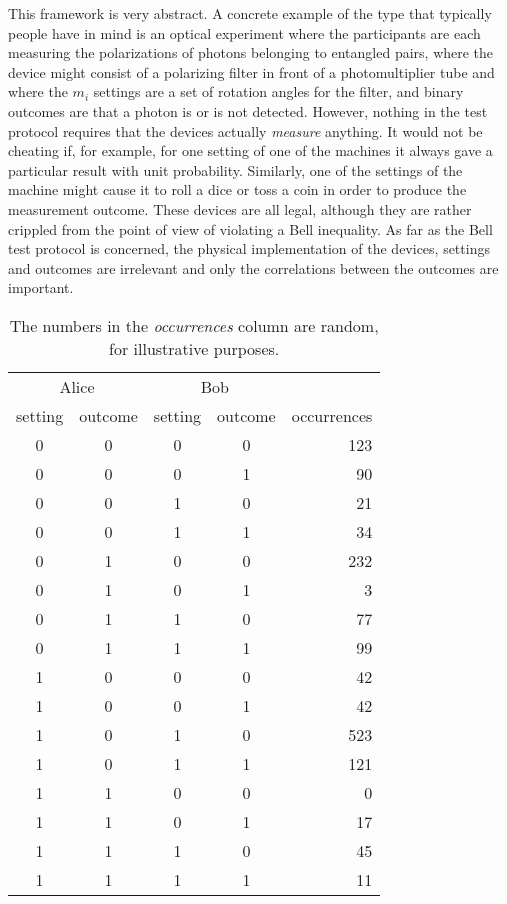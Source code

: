 This framework is very abstract. A concrete example of the type that typically people have in mind is an optical experiment where the participants are each measuring the polarizations of photons belonging to entangled pairs, where the device might consist of a polarizing filter in front of a photomultiplier tube and where the $m_i$ settings are a set of rotation angles for the filter, and binary outcomes are that a photon is or is not detected. However, nothing in the test protocol requires that the devices actually \emph{measure} anything. It would not be cheating if, for example, for one setting of one of the machines it always gave a particular result with unit probability. Similarly, one of the settings of the machine might cause it to roll a dice or toss a coin in order to produce the measurement outcome. These devices are all legal, although they are rather crippled from the point of view of violating a Bell inequality. As far as the Bell test protocol is concerned, the physical implementation of the devices, settings and outcomes are irrelevant and only the correlations between the outcomes are important.

\begin{table}
    \centering
    \footnotesize
    \begin{threeparttable}
    \caption{ The numbers in the \emph{occurrences} column are random, for illustrative purposes.\label{tab:compiled}}
    \begin{singlespace}
        \begin{tabular}{@{}ccccr@{}}
            \toprule
            \multicolumn{2}{c}{Alice} & \multicolumn{2}{c}{Bob}&\\
            \cmidrule(r){1-2}\cmidrule(lr){3-4}
            setting & outcome   & setting & outcome & occurrences\\
            \midrule
            0&0&0&0&123\\
            0&0&0&1&90\\
            0&0&1&0&21\\
            0&0&1&1&34\\
            0&1&0&0&232\\
            0&1&0&1&3\\
            0&1&1&0&77\\
            0&1&1&1&99\\
            1&0&0&0&42\\
            1&0&0&1&42\\
            1&0&1&0&523\\
            1&0&1&1&121\\
            1&1&0&0&0\\
            1&1&0&1&17\\
            1&1&1&0&45\\
            1&1&1&1&11\\
            \bottomrule
        \end{tabular}
    \end{singlespace}
    \end{threeparttable}
\end{table}

